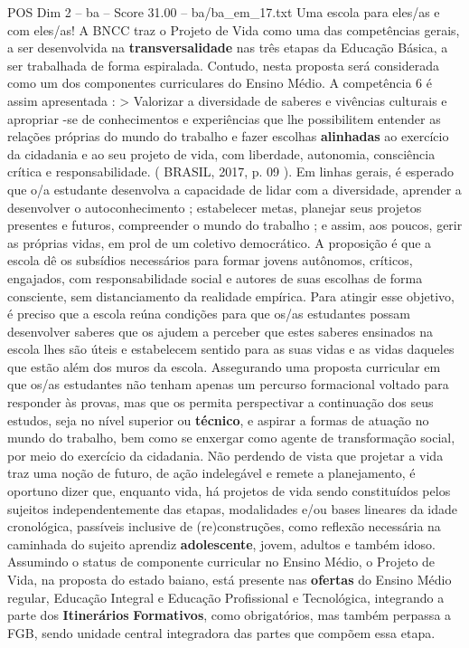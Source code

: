 \begin{textsample}{POS Dim 2 – ba – Score 31.00 – ba/ba\_em\_17.txt}
Uma escola para eles/as e com eles/as!
A BNCC traz o Projeto de Vida como uma das competências gerais, a ser desenvolvida na \textbf{transversalidade} nas três etapas da Educação Básica, a ser trabalhada de forma espiralada.
Contudo, nesta proposta será considerada como um dos componentes curriculares do Ensino Médio.
A competência 6 é assim apresentada : > Valorizar a diversidade de saberes e vivências culturais e apropriar -se de conhecimentos e experiências que lhe possibilitem entender as relações próprias do mundo do trabalho e fazer escolhas \textbf{alinhadas} ao exercício da cidadania e ao seu projeto de vida, com liberdade, autonomia, consciência crítica e responsabilidade. ( BRASIL, 2017, p. 09 ).
Em linhas gerais, é esperado que o/a estudante desenvolva a capacidade de lidar com a diversidade, aprender a desenvolver o autoconhecimento ; estabelecer metas, planejar seus projetos presentes e futuros, compreender o mundo do trabalho ; e assim, aos poucos, gerir as próprias vidas, em prol de um coletivo democrático.
A proposição é que a escola dê os subsídios necessários para formar jovens autônomos, críticos, engajados, com responsabilidade social e autores de suas escolhas de forma consciente, sem distanciamento da realidade empírica.
Para atingir esse objetivo, é preciso que a escola reúna condições para que os/as estudantes possam desenvolver saberes que os ajudem a perceber que estes saberes ensinados na escola lhes são úteis e estabelecem sentido para as suas vidas e as vidas daqueles que estão além dos muros da escola.
Assegurando uma proposta curricular em que os/as estudantes não tenham apenas um percurso formacional voltado para responder às provas, mas que os permita perspectivar a continuação dos seus estudos, seja no nível superior ou \textbf{técnico}, e aspirar a formas de atuação no mundo do trabalho, bem como se enxergar como agente de transformação social, por meio do exercício da cidadania.
Não perdendo de vista que projetar a vida traz uma noção de futuro, de ação indelegável e remete a planejamento, é oportuno dizer que, enquanto vida, há projetos de vida sendo constituídos pelos sujeitos independentemente das etapas, modalidades e/ou bases lineares da idade cronológica, passíveis inclusive de (re)construções, como reflexão necessária na caminhada do sujeito aprendiz \textbf{adolescente}, jovem, adultos e também idoso.
Assumindo o status de componente curricular no Ensino Médio, o Projeto de Vida, na proposta do estado baiano, está presente nas \textbf{ofertas} do Ensino Médio regular, Educação Integral e Educação Profissional e Tecnológica, integrando a parte dos \textbf{Itinerários} \textbf{Formativos}, como obrigatórios, mas também perpassa a FGB, sendo unidade central integradora das partes que compõem essa etapa.

\end{textsample}
